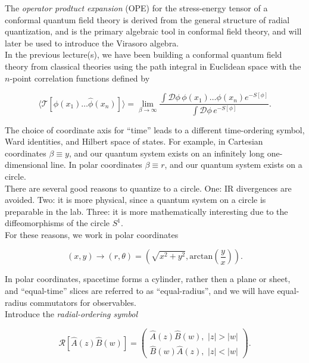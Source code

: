 
\noindent The \textit{operator prodtuct expansion} (OPE) for the stress-energy tensor of a conformal quantum field theory is derived from the general structure of radial quantization, and is the primary algebraic tool in conformal field theory, and will later be used to introduce the Virasoro algebra. \\

\noindent In the previous lecture(s), we have been building a conformal quantum field theory from classical theories using the path integral in Euclidean space with the $n$-point correlation functions defined by

\begin{equation}
\langle \mathcal{T} [\hat{\phi} (x_1) \dots \hat{\phi} (x_n) ] \rangle = \lim_{\beta \rightarrow \infty} \frac{\int \mathcal{D} \phi \, \phi (x_1) \dots \phi (x_n) e^{-S[\phi]}}{\int \mathcal{D} \phi \, e^{-S[\phi]}}.
\end{equation}

\noindent The choice of coordinate axis for ``time'' leads to a different time-ordering symbol, Ward identities, and Hilbert space of states. For example, in Cartesian coordinates $\beta \equiv y$, and our quantum system exists on an infinitely long one-dimensional line. In polar coordinates $\beta \equiv r$, and our quantum system exists on a circle. \\

\noindent There are several good reasons to quantize to a circle. One: IR divergences are avoided. Two: it is more physical, since a quantum system on a circle is preparable in the lab. Three: it is more mathematically interesting due to the diffeomorphisms of the circle $S^1$. \\

\noindent For these reasons, we work in polar coordinates 

\begin{equation}
(x,y) \rightarrow (r,\theta) = \left(\sqrt{x^2 + y^2}, \text{arctan}\left(\frac{y}{x}\right)\right).
\end{equation}

\noindent In polar coordinates, spacetime forms a cylinder, rather then a plane or sheet, and ``equal-time'' slices are referred to as ``equal-radius'', and we will have equal-radius commutators for observables. \\

\noindent Introduce the \textit{radial-ordering symbol}

\begin{equation}
\mathcal{R} [\hat{A}(z) \hat{B} (w) ] = \begin{pmatrix} \hat{A} (z) \hat{B} (w), \,\, |z| > |w| \\ \hat{B} (w) \hat{A} (z), \,\, |z| < |w| \end{pmatrix}.
\end{equation}

